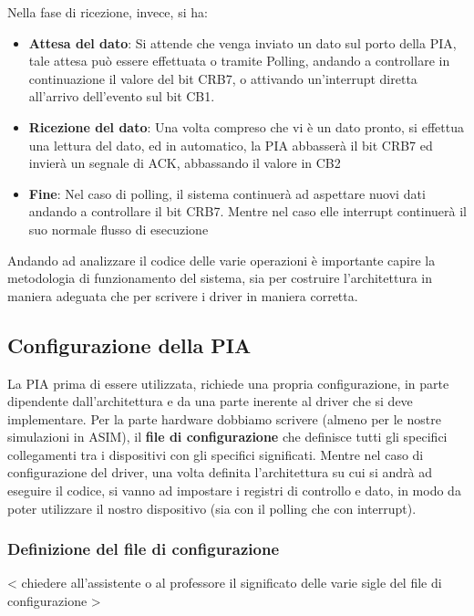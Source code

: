 Nella fase di ricezione, invece, si ha:
\begin{itemize}
    \item \textbf{Attesa del dato}: Si attende che venga inviato un dato sul porto della PIA, tale attesa può essere effettuata o tramite Polling, andando a controllare in continuazione il valore del bit CRB7, o attivando un'interrupt diretta all'arrivo dell'evento sul bit CB1.
    
    \item \textbf{Ricezione del dato}: Una volta compreso che vi è un dato pronto, si effettua una lettura del dato, ed in automatico, la PIA abbasserà il bit CRB7 ed invierà un segnale di ACK, abbassando il valore in CB2

    \item \textbf{Fine}: Nel caso di polling, il sistema continuerà ad aspettare nuovi dati andando a controllare il bit CRB7. Mentre nel caso elle interrupt continuerà il suo normale flusso di esecuzione
\end{itemize}

Andando ad analizzare il codice delle varie operazioni è importante capire la metodologia di funzionamento del sistema, sia per costruire l'architettura in maniera adeguata che per scrivere i driver in maniera corretta.

\subsection{Configurazione della PIA}
La PIA prima di essere utilizzata, richiede una propria configurazione, in parte dipendente dall'architettura e da una parte inerente al driver che si deve implementare.
Per la parte hardware dobbiamo scrivere (almeno per le nostre simulazioni in ASIM), il \textbf{file di configurazione} che definisce tutti gli specifici collegamenti tra i dispositivi con gli specifici significati. Mentre nel caso di configurazione del driver, una volta definita l'architettura su cui si andrà ad eseguire il codice, si vanno ad impostare i registri di controllo e dato, in modo da poter utilizzare il nostro dispositivo (sia con il polling che con interrupt).

\subsubsection{Definizione del file di configurazione}
< chiedere all'assistente o al professore il significato delle varie sigle del file di configurazione >

